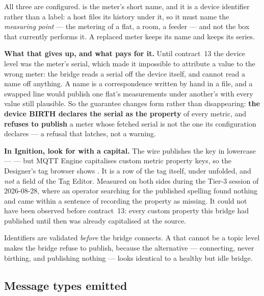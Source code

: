 All three are configured.  is the meter's short name, and it is a device
identifier rather than a label: a host files its history under it, so it must name the
\emph{measuring point} --- the metering of a flat, a room, a feeder --- and not the box that
currently performs it. A replaced meter keeps its name and keeps its series.

\textbf{What that gives up, and what pays for it.} Until contract~13 the device level was the
meter's serial, which made it impossible to attribute a value to the wrong meter: the bridge
reads a serial off the device itself, and cannot read a name off anything. A name is a
correspondence written by hand in a file, and a swapped line would publish one flat's
measurements under another's with every value still plausible. So the guarantee changes form
rather than disappearing: \textbf{the device BIRTH declares the serial as the 
property} of every metric, and \prog{} \textbf{refuses to publish} a meter whose fetched serial
is not the one its configuration declares --- a refusal that latches, not a warning.

\begin{note}
\textbf{In Ignition, look for  with a capital.} The wire publishes the key in
lowercase ---  --- but MQTT Engine capitalises custom metric property keys, so the
Designer's tag browser shows . It is a row of the tag itself, under
 unfolded, and \emph{not} a field of the Tag
Editor. Measured on both sides during the Tier-3 session of 2026-08-28, where an operator
searching for the published spelling found nothing and came within a sentence of recording the
property as missing. It could not have been observed before contract~13: every custom property
this bridge had published until then was already capitalised at the source.
\end{note}

Identifiers are validated \emph{before} the bridge connects. A  that cannot be a
topic level makes the bridge refuse to publish, because the alternative — connecting,
never birthing, and publishing nothing — looks identical to a healthy but idle bridge.

\subsection{Message types emitted}

